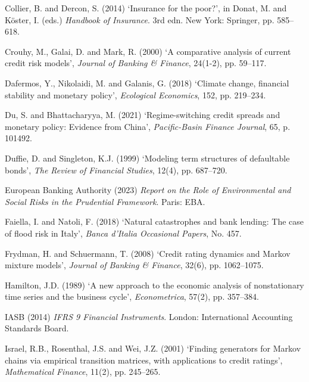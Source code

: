 \documentclass[12pt,a4paper]{article}
\begin{document}
\begin{description}[style=nextline, leftmargin=0pt, labelwidth=0pt, itemsep=0.5em]
\item Collier, B. and Dercon, S. (2014) `Insurance for the poor?', in Donat, M. and K\"oster, I. (eds.) \textit{Handbook of Insurance}. 3rd edn. New York: Springer, pp. 585--618.

\item Crouhy, M., Galai, D. and Mark, R. (2000) `A comparative analysis of current credit risk models', \textit{Journal of Banking \& Finance}, 24(1-2), pp. 59--117.

\item Dafermos, Y., Nikolaidi, M. and Galanis, G. (2018) `Climate change, financial stability and monetary policy', \textit{Ecological Economics}, 152, pp. 219--234.

\item Du, S. and Bhattacharyya, M. (2021) `Regime-switching credit spreads and monetary policy: Evidence from China', \textit{Pacific-Basin Finance Journal}, 65, p. 101492.

\item Duffie, D. and Singleton, K.J. (1999) `Modeling term structures of defaultable bonds', \textit{The Review of Financial Studies}, 12(4), pp. 687--720.

\item European Banking Authority (2023) \textit{Report on the Role of Environmental and Social Risks in the Prudential Framework}. Paris: EBA.

\item Faiella, I. and Natoli, F. (2018) `Natural catastrophes and bank lending: The case of flood risk in Italy', \textit{Banca d'Italia Occasional Papers}, No. 457.

\item Frydman, H. and Schuermann, T. (2008) `Credit rating dynamics and Markov mixture models', \textit{Journal of Banking \& Finance}, 32(6), pp. 1062--1075.

\item Hamilton, J.D. (1989) `A new approach to the economic analysis of nonstationary time series and the business cycle', \textit{Econometrica}, 57(2), pp. 357--384.

\item IASB (2014) \textit{IFRS 9 Financial Instruments}. London: International Accounting Standards Board.

\item Israel, R.B., Rosenthal, J.S. and Wei, J.Z. (2001) `Finding generators for Markov chains via empirical transition matrices, with applications to credit ratings', \textit{Mathematical Finance}, 11(2), pp. 245--265.


\end{description}
\end{document}
